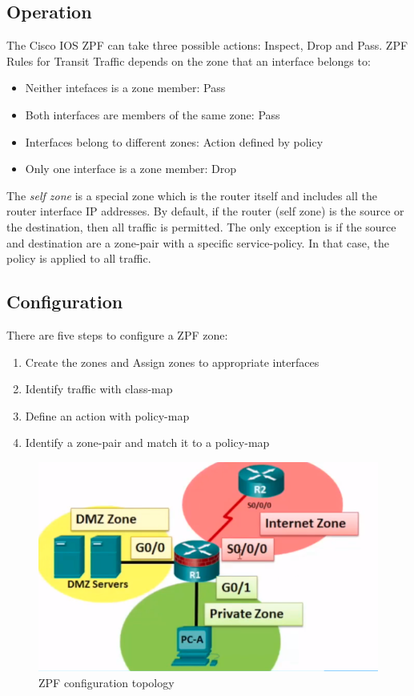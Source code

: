 \subsection{Operation}

The Cisco IOS ZPF can take three possible actions: Inspect, Drop and Pass. ZPF Rules for Transit Traffic depends on the zone that an interface belongs to:

\begin{itemize}
\item Neither intefaces is a zone member: Pass
\item Both interfaces are members of the same zone: Pass
\item Interfaces belong to different zones: Action defined by policy
\item Only one interface is a zone member: Drop
\end{itemize}

The \emph{self zone} is a special zone which is the router itself and includes all the router interface IP addresses. By default, if the router (self zone) is the source or the destination, then all traffic is permitted. The only exception is if the source and destination are a zone-pair with a specific service-policy. In that case, the policy is applied to all traffic.

\subsection{Configuration}

There are five steps to configure a ZPF zone:

\begin{enumerate}
\item Create the zones and Assign zones to appropriate interfaces
\item Identify traffic with class-map
\item Define an action with policy-map
\item Identify a zone-pair and match it to a policy-map
\end{enumerate}

\begin{figure}[hbtp]
\caption{ZPF configuration topology}\label{Zone}
\centering
\includegraphics[scale=0.7]{pictures/Zone.PNG}
\end{figure}


